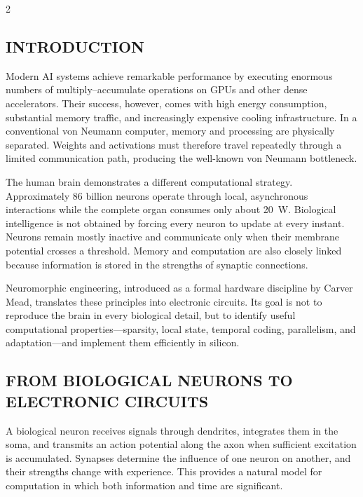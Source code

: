 \begin{multicols}{2}
  \subsection*{\centering\uppercase{Introduction}}
  Modern AI systems achieve remarkable performance by executing enormous numbers of multiply--accumulate operations on GPUs and other dense accelerators. Their success, however, comes with high energy consumption, substantial memory traffic, and increasingly expensive cooling infrastructure. In a conventional von Neumann computer, memory and processing are physically separated. Weights and activations must therefore travel repeatedly through a limited communication path, producing the well-known von Neumann bottleneck.

  \noindent
  The human brain demonstrates a different computational strategy. Approximately 86 billion neurons operate through local, asynchronous interactions while the complete organ consumes only about 20~W. Biological intelligence is not obtained by forcing every neuron to update at every instant. Neurons remain mostly inactive and communicate only when their membrane potential crosses a threshold. Memory and computation are also closely linked because information is stored in the strengths of synaptic connections.

  \noindent
  Neuromorphic engineering, introduced as a formal hardware discipline by Carver Mead, translates these principles into electronic circuits. Its goal is not to reproduce the brain in every biological detail, but to identify useful computational properties---sparsity, local state, temporal coding, parallelism, and adaptation---and implement them efficiently in silicon.

  \begin{center}
\begin{minipage}{0.98\columnwidth}
\centering
    \arjunArchitectureFigure
\end{minipage}
  \end{center}

  \subsection*{\centering\uppercase{From Biological Neurons to Electronic Circuits}}
  A biological neuron receives signals through dendrites, integrates them in the soma, and transmits an action potential along the axon when sufficient excitation is accumulated. Synapses determine the influence of one neuron on another, and their strengths change with experience. This provides a natural model for computation in which both information and time are significant.


\end{multicols}
